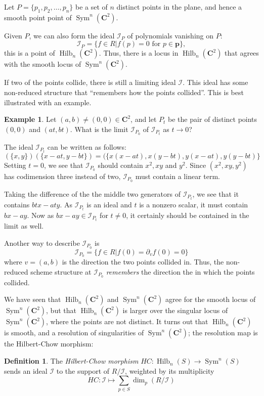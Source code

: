 \documentclass{amsart}[12pt]
\theoremstyle{definition}
\newtheorem{example}[dummy]{Example}
\newtheorem{definition}[dummy]{Definition}
\newcommand{\C}{\mathbf{C}}
\newcommand{\II}{\mathcal{I}}
\DeclareMathOperator{\Hilb}{Hilb}
\DeclareMathOperator{\Sym}{Sym}
\begin{document}
Let $P=\{p_1,p_2,\dots, p_n\}$ be a set of $n$ distinct points in the plane, and hence a smooth point point of $\Sym^n(\C^2)$.  

Given $P$, we can also form the ideal $\II_P$ of polynomials vanishing on $P$:
 $$\II_{P}=\{f\in R| f(p)=0 \text{ for }p\in \mathbf{p}\},$$  
this is a point of $\Hilb_n(\C^2)$.  Thus, there is a locus in $\Hilb_n(\C^2)$ that agrees with the smooth locus of $\Sym^n(\C^2)$. 

 If two of the points collide, there is still a limiting ideal $\II$.  This ideal has some non-reduced structure that ``remembers how the points collided''.  This is best illustrated with an example.


\begin{example}
Let $(a,b)\neq (0,0)\in\C^2$, and let $P_t$ be the pair of distinct points $(0,0)$ and $(at,bt)$.  What is the limit $\II_{P_0}$ of $\II_{P_t}$ as $t\to 0$?

The ideal $\II_{P_t}$ can be written as follows: 
$$(\{x,y\})(\{x-at,y-bt\})=(\{x(x-at),x(y-bt), y(x-at), y(y-bt)\}$$
Setting $t=0$, we see that $\II_{P_0}$ should contain $x^2, xy$ and $y^2$.  Since $(x^2,xy,y^2)$ has codimension three instead of two, $\II_{P_0}$ must contain a linear term.

Taking the difference of the the middle two generators of $\II_{P_t}$, we see that it contains $btx-aty$. As $\II_{P_t}$ is an ideal and $t$ is a nonzero scalar, it must contain $bx-ay$.  Now as $bx-ay\in \II_{P_t}$ for $t\neq 0$, it certainly should be contained in the limit as well.  

Another way to describe $\II_{P_0}$ is
$$\II_{P_0}=\{f\in R| f(0)=\partial_vf(0)=0\}$$
where $v=(a,b)$ is the direction the two points collided in.  Thus, the non-reduced scheme structure at $\II_{P_0}$ \emph{remembers} the direction the in which the points collided. 
\end{example}

We have seen that $\Hilb_n(\C^2)$ and $\Sym^n(\C^2)$ agree for the smooth locus of $\Sym^n(\C^2)$, but that $\Hilb_n(\C^2)$ is larger over the singular locus of $\Sym^n(\C^2)$, where the points are not distinct.  It turns out that $\Hilb_n(\C^2)$ is smooth, and a resolution of singularities of $\Sym^n(\C^2)$; the resolution map is the Hilbert-Chow morphism:

\begin{definition}
The \emph{Hilbert-Chow morphism} $HC:\Hilb_n(S)\to\Sym^n(S)$ sends an ideal $\II$ to the support of $R/\II$, weighted by its multiplicity
$$HC:\II\mapsto \sum_{p\in S} \dim_p (R/\II)$$
\end{definition}
\end{document}
